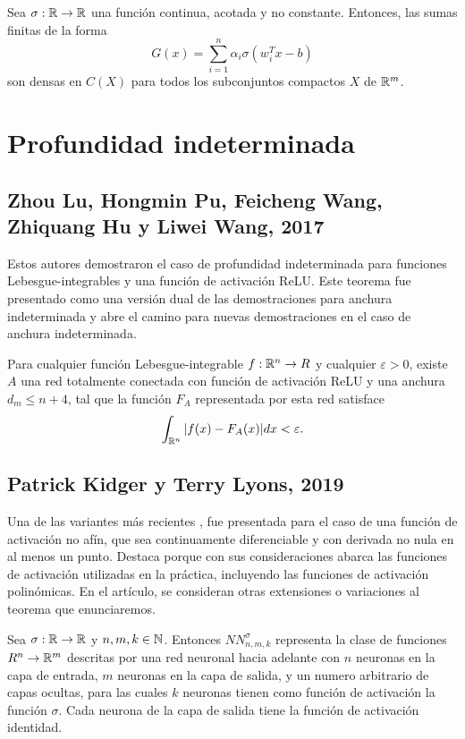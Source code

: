 \begin{itemize}
\begin{teorema}
Sea $\sigma: \mathbb{R} \to \mathbb{R}$ una función continua, acotada y no constante. Entonces, las sumas finitas de la forma $$G(x)=\sum_{i=1}^n \alpha_i \sigma(w_i^Tx-b)$$ son densas en $C(X)$ para todos los subconjuntos compactos $X$ de $\mathbb{R}^m$.
\end{teorema}

\section{Profundidad indeterminada}

\subsection{Zhou Lu, Hongmin Pu, Feicheng Wang, Zhiquang Hu y Liwei Wang, 2017}
Estos autores demostraron \cite{2017arXiv170902540L} el caso de profundidad indeterminada para funciones Lebesgue-integrables y una función de activación ReLU. Este teorema fue presentado como una versión dual de las demostraciones para anchura indeterminada y abre el camino para nuevas demostraciones en el caso de anchura indeterminada.

\begin{teorema}
Para cualquier función Lebesgue-integrable $f:\mathbb{R}^n\to R$ y cualquier $\varepsilon>0$, existe $A$ una red totalmente conectada con función de activación ReLU y una anchura $d_m\leq n+4$, tal que la función $F_A$ representada por esta red satisface $$\int_{\mathbb{R}^n}|f(x)-F_A(x)|dx<\varepsilon.$$
\end{teorema}

\subsection{Patrick Kidger y Terry Lyons, 2019}
Una de las variantes más recientes \cite{2019arXiv190508539K}, fue presentada para el caso de una función de activación no afín, que sea continuamente diferenciable y con derivada no nula en al menos un punto. Destaca porque con sus consideraciones abarca las funciones de activación utilizadas en la práctica, incluyendo las funciones de activación polinómicas. En el artículo, se consideran otras extensiones o variaciones al teorema que enunciaremos.\\

\begin{definicion}
Sea $\sigma:\mathbb{R}\to\mathbb{R}$ y $n,m,k\in\mathbb{N}$. Entonces $NN_{n,m,k}^\sigma$ representa la clase de funciones $R^n\to \mathbb{R}^m$ descritas por una red neuronal hacia adelante con $n$ neuronas en la capa de entrada, $m$ neuronas en la capa de salida, y un numero arbitrario de capas ocultas, para las cuales $k$ neuronas tienen como función de activación la función $\sigma$. Cada neurona de la capa de salida tiene la función de activación identidad.
\end{definicion}


\end{itemize}
